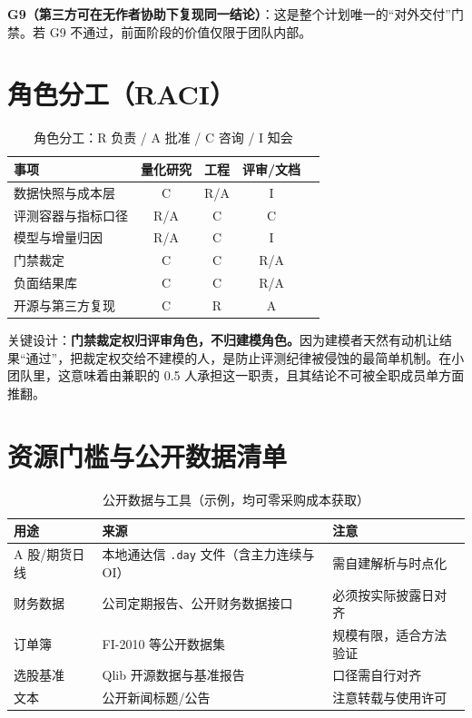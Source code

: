 \documentclass[11pt,a4paper]{ctexart}
\begin{document}
\noindent\textbf{G9（第三方可在无作者协助下复现同一结论）}：这是整个计划唯一的“对外交付”门禁。若 G9 不通过，前面阶段的价值仅限于团队内部。

\section{角色分工（RACI）}

\begin{table}[htbp]
\centering
\caption{角色分工：R 负责 / A 批准 / C 咨询 / I 知会}
\label{tab:raci}
\begin{tabular}{@{}>{\raggedright\arraybackslash}p{2.6cm}cccc@{}}
\toprule
事项 & 量化研究 & 工程 & 评审/文档 \\
\midrule
数据快照与成本层 & C & R/A & I \\
评测容器与指标口径 & R/A & C & C \\
模型与增量归因 & R/A & C & I \\
门禁裁定 & C & C & R/A \\
负面结果库 & C & C & R/A \\
开源与第三方复现 & C & R & A \\
\bottomrule
\end{tabular}
\end{table}

\noindent 关键设计：\textbf{门禁裁定权归评审角色，不归建模角色。}因为建模者天然有动机让结果“通过”，把裁定权交给不建模的人，是防止评测纪律被侵蚀的最简单机制。在小团队里，这意味着由兼职的 0.5 人承担这一职责，且其结论不可被全职成员单方面推翻。

\section{资源门槛与公开数据清单}

\begin{table}[htbp]
\centering
\caption{公开数据与工具（示例，均可零采购成本获取）}
\label{tab:data}
\begin{tabular}{@{}>{\raggedright\arraybackslash}p{3.0cm}>{\raggedright\arraybackslash}p{8.0cm}>{\raggedright\arraybackslash}p{3.4cm}@{}}
\toprule
用途 & 来源 & 注意 \\
\midrule
A 股/期货日线 & 本地通达信 \texttt{.day} 文件（含主力连续与 OI） & 需自建解析与时点化 \\
财务数据 & 公司定期报告、公开财务数据接口 & 必须按实际披露日对齐 \\
订单簿 & FI-2010 等公开数据集 & 规模有限，适合方法验证 \\
选股基准 & Qlib 开源数据与基准报告 & 口径需自行对齐 \\
文本 & 公开新闻标题/公告 & 注意转载与使用许可 \\
\bottomrule
\end{tabular}
\end{table}
\end{document}
